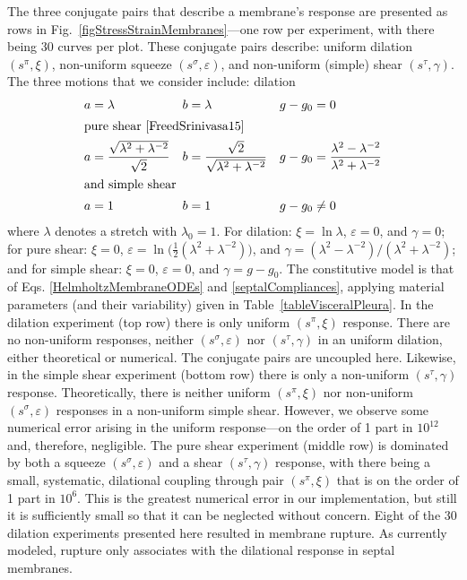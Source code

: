 The three conjugate pairs that describe a membrane's response are presented as rows in Fig.~\ref{figStressStrainMembranes}---one row per experiment, with there being 30 curves per plot.  These conjugate pairs describe: uniform dilation $( s^{\pi} , \xi )$, non-uniform squeeze $( s^{\sigma} , \varepsilon )$, and non-uniform (simple) shear $( s^{\tau} , \gamma )$.  The three motions that we consider include: \newline dilation
\begin{subequations}
    \label{membraneExperiments}
    \begin{align}
    a & = \lambda & b & = \lambda & g - g_0 & = 0 
    \label{dilationExperiment}\\
    \intertext{pure shear \cite{FreedSrinivasa15}}
    a & = \frac{\sqrt{\lambda^2 + \lambda^{-2}}}{\sqrt{2}} & 
    b & = \frac{\sqrt{2}}{\sqrt{\lambda^2 + \lambda^{-2}}} & g - g_0 &  = 
    \frac{\lambda^2 - \lambda^{-2}}{\lambda^2 + \lambda^{-2}} 
    \label{pureShearExperiment} \\
    \intertext{and simple shear}
    a & = 1 & b & = 1 & g - g_0 & \neq 0
    \label{simpleShearExperiment}
    \end{align}
\end{subequations}
where $\lambda$ denotes a stretch with $\lambda_0 = 1$.  For dilation: $\xi = \ln \lambda$, $\varepsilon = 0$, and $\gamma = 0$; for pure shear: $\xi = 0$, $\varepsilon = \ln \bigl( \tfrac{1}{2} ( \lambda^2 + \lambda^{-2}) \bigr)$, and $\gamma = ( \lambda^2 - \lambda^{-2} ) / (\lambda^2 + \lambda^{-2})$; and for simple shear: $\xi = 0$, $\varepsilon = 0$, and $\gamma = g - g_0$.  The constitutive model is that of Eqs. \ref{HelmholtzMembraneODEs} and \ref{septalCompliances}, applying material parameters (and their variability) given in Table~\ref{tableVisceralPleura}.  In the dilation experiment (top row) there is only uniform $( s^{\pi} \! , \xi)$ response.  There are no non-uniform responses, neither $( s^{\sigma} \! , \varepsilon)$ nor $( s^{\tau} \! , \gamma)$ in an uniform dilation, either theoretical or numerical.  The conjugate pairs are uncoupled here.  Likewise, in the simple shear experiment (bottom row) there is only a non-uniform $( s^{\tau} \! , \gamma)$ response.  Theoretically, there is neither uniform $( s^{\pi} \! , \xi)$ nor non-uniform $( s^{\sigma} \! , \varepsilon)$ responses in a non-uniform simple shear.  However, we observe some numerical error arising in the uniform response---on the order of 1 part in $10^{12}$ and, therefore, negligible.  The pure shear experiment (middle row) is dominated by both a squeeze $( s^{\sigma} \! , \varepsilon)$ and a shear  $( s^{\tau} \! , \gamma)$ response, with there being a small, systematic, dilational coupling through pair $( s^{\pi} \! , \xi)$ that is on the order of 1 part in $10^6$.  This is the greatest numerical error in our implementation, but still it is sufficiently small so that it can be neglected without concern.  Eight of the 30 dilation experiments presented here resulted in membrane rupture.  As currently modeled, rupture only associates with the dilational response in septal membranes.

